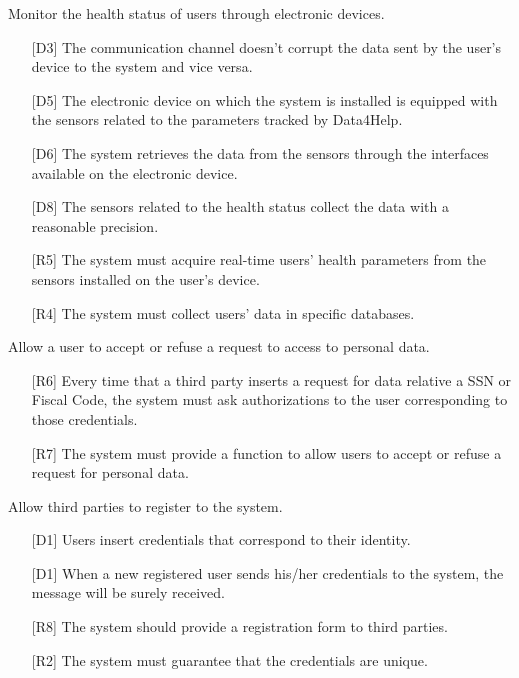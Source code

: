 \begin{enumerate} [label={[G\arabic*]}]
    \item Monitor the health status of users through electronic devices.
        \begin{itemize}
            \item [{[D3]}] The communication channel doesn't corrupt the data sent by the user's device to the system and vice versa.
            \item [{[D5]}] The electronic device on which the system is installed is equipped with the sensors related to the parameters tracked by Data4Help.
            \item [{[D6]}] The  system  retrieves  the  data  from  the  sensors  through  the  interfaces available on the electronic device.
            \item [{[D8]}] The sensors related to the health status collect the data with a reasonable precision.
            \item [{[R5]}] The system must acquire real-time users' health parameters from the sensors installed on the user's device.
            \item [{[R4]}] The system must collect users' data in specific databases.
        \end{itemize}
        
    \item Allow a user to accept or refuse a request to access to personal data.
    \begin{itemize}
            \item [{[R6]}] Every time that a third party inserts a request for data relative a SSN or Fiscal Code, the system must ask authorizations to the user corresponding to those credentials.
            \item [{[R7]}] The system must provide a function to allow users to accept or refuse a request for personal data.
        \end{itemize}

    \item Allow third parties to register to the system.
        \begin{itemize}
            \item [{[D1]}] Users insert credentials that correspond to their identity.
            \item [{[D1]}] When a new registered user sends his/her credentials to the system, the message will be surely received.
            \item [{[R8]}] The system should provide a registration form to third parties.
            \item [{[R2]}] The system must guarantee that the credentials are unique.
        \end{itemize}
        

\end{enumerate}

